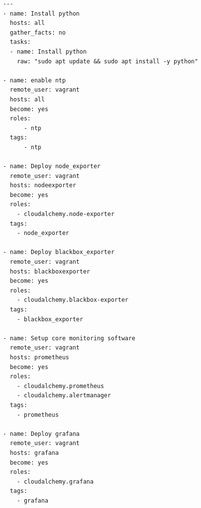 \documentclass[titlepage]{report}
\begin{document}
\begin{lstlisting}[caption={Playbook für das gesamte
Deployment},label={lst:ansibleplaybookdeployment},basicstyle=\small]
---
- name: Install python
  hosts: all
  gather_facts: no
  tasks:
  - name: Install python
    raw: "sudo apt update && sudo apt install -y python"

- name: enable ntp
  remote_user: vagrant
  hosts: all
  become: yes
  roles:
      - ntp
  tags:
      - ntp

- name: Deploy node_exporter
  remote_user: vagrant
  hosts: nodeexporter
  become: yes
  roles:
    - cloudalchemy.node-exporter
  tags:
    - node_exporter

- name: Deploy blackbox_exporter
  remote_user: vagrant
  hosts: blackboxexporter
  become: yes
  roles:
    - cloudalchemy.blackbox-exporter
  tags:
    - blackbox_exporter

- name: Setup core monitoring software
  remote_user: vagrant
  hosts: prometheus
  become: yes
  roles:
    - cloudalchemy.prometheus
    - cloudalchemy.alertmanager
  tags:
    - prometheus

- name: Deploy grafana
  remote_user: vagrant
  hosts: grafana
  become: yes
  roles:
    - cloudalchemy.grafana
  tags:
    - grafana
\end{lstlisting}
\end{document}
